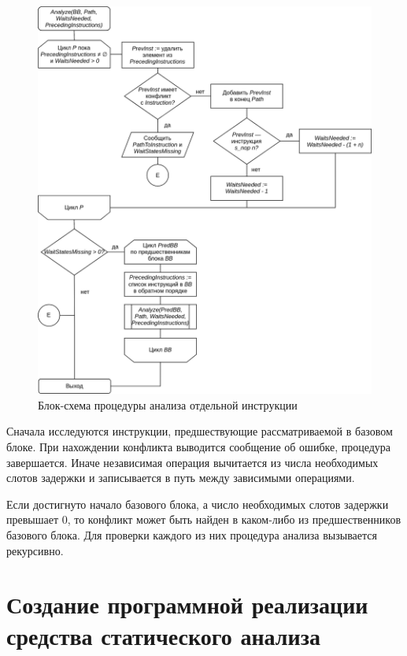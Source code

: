 \documentclass[a4paper,14pt]{extarticle}
\begin{document}
{\begin{figure}[H]
\centering
\includegraphics[width=\textwidth]{diagrams/alg-wait-states-analyze}
\caption{Блок-схема процедуры анализа отдельной инструкции}
\label{fig:diagram-wait-states-analyze}
\end{figure}

Сначала исследуются инструкции, предшествующие рассматриваемой в базовом блоке. 
При нахождении конфликта выводится сообщение об ошибке, процедура завершается.
Иначе независимая операция вычитается из числа необходимых слотов задержки
и записывается в путь между зависимыми операциями.

Если достигнуто начало базового блока, а число необходимых слотов задержки превышает 0,
то конфликт может быть найден в каком-либо из предшественников базового блока.
Для проверки каждого из них процедура анализа вызывается рекурсивно.

\newpage
\section{Создание программной реализации средства статического анализа}

}
\end{document}
